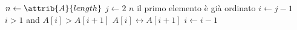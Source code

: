 \begin{codebox}
    \li $n \gets \attrib{A}{length}$
    \li \For $j \gets 2$ \To $n$
        \Comment il primo elemento è già ordinato
    \li		\Do
    			$i \gets j-1$
    \li			\While $i > 1$ and $A[i] > A[i+1]$
    \li				\Do
                        $A[i] \leftrightarrow A[i+1]$
    \li					$i \gets i-1$
                    \End
            \End
    \end{codebox}